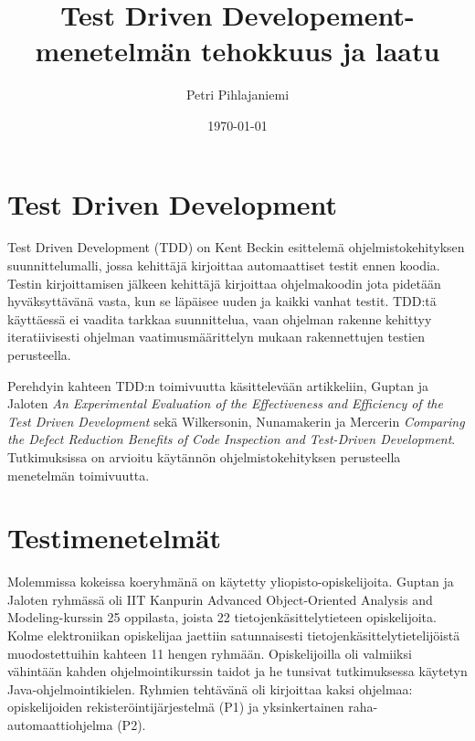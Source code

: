 \documentclass[finnish]{tktltiki2}
\title{Test Driven Developement-menetelmän tehokkuus ja laatu}
\author{Petri Pihlajaniemi}
\date{\today}
\theoremstyle{definition}
\theoremstyle{remark}
\begin{document}


\maketitle        %



\mainmatter       %



\section*{Test Driven Development}

Test Driven Development (TDD) on Kent Beckin esittelemä ohjelmistokehityksen suunnittelumalli, jossa kehittäjä kirjoittaa automaattiset testit ennen koodia. Testin kirjoittamisen jälkeen kehittäjä kirjoittaa ohjelmakoodin jota pidetään hyväksyttävänä vasta, kun se läpäisee uuden ja kaikki vanhat testit. TDD:tä käyttäessä ei vaadita tarkkaa suunnittelua, vaan ohjelman rakenne kehittyy iteratiivisesti ohjelman vaatimusmäärittelyn mukaan rakennettujen testien perusteella.






Perehdyin kahteen TDD:n toimivuutta käsittelevään artikkeliin, Guptan ja Jaloten \textit{An Experimental Evaluation of the Effectiveness and Efficiency of the Test Driven Development}\cite{Gupta07} sekä Wilkersonin, Nunamakerin ja Mercerin \textit{Comparing the Defect Reduction Benefits of Code Inspection and Test-Driven Development}\cite{Wilkerson12}. Tutkimuksissa on arvioitu käytännön ohjelmistokehityksen perusteella menetelmän toimivuutta.


\section*{Testimenetelmät}

Molemmissa kokeissa koeryhmänä on käytetty yliopisto-opiskelijoita. Guptan ja Jaloten ryhmässä oli IIT Kanpurin Advanced Object-Oriented Analysis and Modeling-kurssin 25 oppilasta, joista 22 tietojenkäsittelytieteen opiskelijoita. Kolme elektroniikan opiskelijaa jaettiin satunnaisesti tietojenkäsittelytietelijöistä muodostettuihin kahteen 11 hengen ryhmään. Opiskelijoilla oli valmiiksi vähintään kahden ohjelmointikurssin taidot ja he tunsivat tutkimuksessa käytetyn Java-ohjelmointikielen. Ryhmien tehtävänä oli kirjoittaa kaksi ohjelmaa: opiskelijoiden rekisteröintijärjestelmä (P1) ja yksinkertainen raha-automaattiohjelma (P2).
\end{document}
